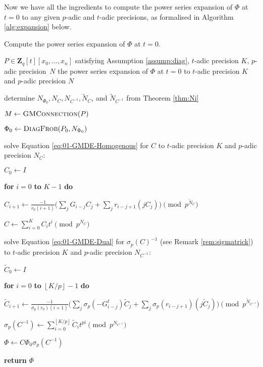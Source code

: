 \documentclass[a4paper,11pt]{article}
\numberwithin{equation}{section}
\providecommand{\floor}[1]{\left\lfloor#1\right\rfloor}   %
\newcommand{\ZZ}{\mathbf{Z}} %
\theoremstyle{definition}
\begin{document}
Now we have all the ingredients to compute the power series expansion of $\Phi$ at $t=0$ to any 
given $p$-adic and $t$-adic precisions, as formalised in Algorithm \ref{alg:expansion} below.

\begin{algorithm}
\caption{Compute the power series expansion of $\Phi$ at $t=0$.}
\label{alg:expansion}
\begin{algorithmic}
\vspace{1mm}
\Require $P \in \ZZ_q[t][x_0,\ldots,x_n]$ satisfying Assumption \ref{assump:diag}, $t$-adic precision $K$, $p$-adic precision~$N$
\Ensure  the power series expansion of $\Phi$ at $t=0$ to $t$-adic precision $K$ and $p$-adic precision $N$
\State \begin{compactenum}[{\hspace{6pt}} 1.] \vspace{-1.24em}
\item determine $N_{\Phi_0},N_C,N_{C^{-1}},\tilde{N}_C$, and $\tilde{N}_{C^{-1}}$ from Theorem \ref{thm:Ni}
\item $M \gets \textsc{GMConnection}(P)$
\item $\Phi_0 \gets \textsc{DiagFrob}(P_0,N_{\Phi_0})$
\item solve Equation \eqref{eq:01-GMDE-Homogenous} for $C$ to $t$-adic precision $K$ and $p$-adic precision $N_{C}$:
\begin{compactenum}[a.] 
\item[] $C_0 \gets I$
\item[] \textbf{for} $i=0$ \textbf{to} $K-1$ \textbf{do} 
\item[] \hspace{0.6em} $C_{i+1} \gets \frac{-1}{r_0 (i+1)} \biggl(\sum_j G_{i-j} C_j + \sum_j r_{i-j+1} (j C_j) \biggr) \pmod{p^{\tilde{N}_C}}$
\item[] $C \gets \sum_{i=0}^K C_i t^i \pmod{p^{N_C}}$
\end{compactenum}
\item solve Equation \eqref{eq:01-GMDE-Dual} for $\sigma_p(C)^{-1}$ (see Remark \ref{rem:sigmatrick}) to $t$-adic precision $K$ and $p$-adic precision $N_{C^{-1}}$:
\begin{compactenum}[a.]
\item[] $\tilde{C}_0 \gets I$
\item[] \textbf{for} $i=0$ \textbf{to} $\floor{K/p}-1$ \textbf{do}
\item[] \hspace{0.6em} $\tilde{C}_{i+1} \gets  \frac{-1}{\sigma_p(r_0)(i+1)} \biggl(\sum_j \sigma_p(-G_{i-j}^t) \tilde{C}_j + \sum_j \sigma_p(r_{i-j+1}) (j \tilde{C}_j) \biggr) \pmod{p^{\tilde{N}_{C^{-1}}}}$
\item[] $\sigma_p(C^{-1}) \gets \sum_{i=0}^{\floor{K/p}} \tilde{C}_i t^{pi} \pmod{p^{N_{C^{-1}}}}$
\end{compactenum}
\item $\Phi \gets C \Phi_0 \sigma_p(C^{-1})$
\item \textbf{return} $\Phi$
\end{compactenum}
\EndProcedure
\end{algorithmic}
\end{algorithm}
\end{document}
